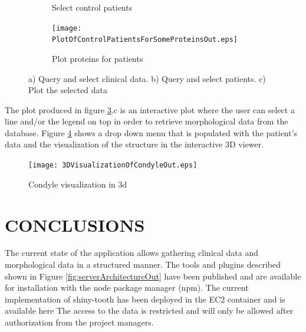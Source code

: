 \documentclass[]{spie}  %
\begin{document}
\begin{figure}
\begin{subfigure}{0.3\textwidth}
    	\caption{Select control patients}
    	\label{fig:SelectPatients}
	\end{subfigure}
	\begin{subfigure}{0.3\textwidth}
    	\texttt{[image: PlotOfControlPatientsForSomeProteinsOut.eps]}
    	\caption{Plot proteins for patients}
    	\label{fig:PlotOfControlPatientsForSomeProteins}
	\end{subfigure}
	\caption[Import and generate clinical data]{a) Query and select clinical data. b) Query and select patients. c) Plot the selected data}
	\label{fig:queryAndSelect}
\end{figure}

The plot produced in figure \ref{fig:queryAndSelect}.c is an interactive plot where the user can select a line and/or the legend on top 
in order to retrieve morphological data from the database. Figure \ref{fig:3DVisualizationOfCondyle} shows a drop down menu that is populated 
with the patient's data and the visualization of the structure in the interactive 3D viewer.

\begin{figure}
	\centering 
	\texttt{[image: 3DVisualizationOfCondyleOut.eps]}
	\caption[Visualization]{Condyle visualization in 3d}
	\label{fig:3DVisualizationOfCondyle}
\end{figure}

\section{CONCLUSIONS} 

The current state of the application allows gathering clinical data and morphological data in a structured manner. 
The tools and plugins described shown in Figure \ref{fig:serverArchitectureOut} have been 
published%
and are available for installation with the node package manager (npm). 
The current implementation of shiny-tooth has been deployed in the EC2 container and is available 
here%
The access to the data is restricted and will only be allowed after authorization from the project managers. 



\scriptsize
\end{document}
